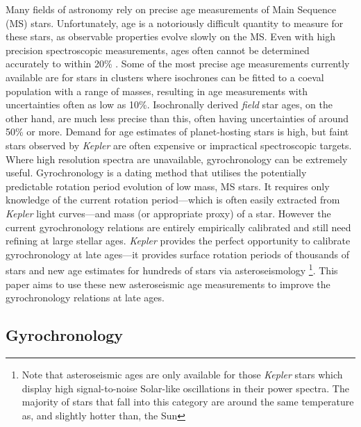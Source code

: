 Many fields of astronomy rely on precise age measurements of Main Sequence
(MS) stars.
Unfortunately, age is a notoriously difficult quantity to measure for these
stars, as observable properties evolve slowly on the MS.
Even with high precision spectroscopic measurements, ages often cannot be
determined accurately to within 20\% \citep{Soderblom2010}.
Some of the most precise age measurements currently available are for stars in
clusters where isochrones can be fitted to a coeval population with a range of
masses, resulting in age measurements with uncertainties often as low as 10\%.
Isochronally derived {\it field} star ages, on the other hand, are much less
precise than this, often having uncertainties of around 50\% or more.
Demand for age estimates of planet-hosting stars is high, but faint stars
observed by {\it Kepler} are often expensive or impractical spectroscopic
targets.
Where high resolution spectra are unavailable, gyrochronology can be
extremely useful.
Gyrochronology is a dating method that utilises the potentially
predictable rotation period evolution of low mass, MS stars.
It requires only knowledge of the current rotation period---which is often
easily extracted from {\it Kepler} light curves---and mass (or appropriate
proxy) of a star.
However the current gyrochronology relations are entirely empirically
calibrated and still need refining at large stellar ages.
{\it Kepler} provides the perfect opportunity to calibrate gyrochronology at
late ages---it provides surface rotation periods of thousands of stars and new
age estimates for hundreds of stars via asteroseismology \footnote{Note that
asteroseismic ages are only available for those {\it Kepler} stars which
display high signal-to-noise Solar-like oscillations in their power spectra.
The majority of stars that fall into this category are around the same
temperature as, and slightly hotter than, the Sun}.  %
This paper aims to use these new asteroseismic age measurements to improve the
gyrochronology relations at late ages.

\subsection{Gyrochronology}

